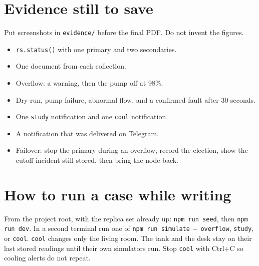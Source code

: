 \documentclass[11pt,a4paper]{article}
\begin{document}
\section{Evidence still to save}

Put screenshots in \texttt{evidence/} before the final PDF. Do not invent the figures.

\begin{itemize}
\item \texttt{rs.status()} with one primary and two secondaries.
\item One document from each collection.
\item Overflow: a warning, then the pump off at 98\%.
\item Dry-run, pump failure, abnormal flow, and a confirmed fault after 30 seconds.
\item One \texttt{study} notification and one \texttt{cool} notification.
\item A notification that was delivered on Telegram.
\item Failover: stop the primary during an overflow, record the election, show the cutoff incident still stored, then bring the node back.
\end{itemize}

\section{How to run a case while writing}

From the project root, with the replica set already up: \texttt{npm run seed}, then \texttt{npm run dev}. In a second terminal run one of \texttt{npm run simulate -- overflow}, \texttt{study}, or \texttt{cool}. \texttt{cool} changes only the living room. The tank and the desk stay on their last stored readings until their own simulators run. Stop \texttt{cool} with Ctrl+C so cooling alerts do not repeat.
\end{document}
